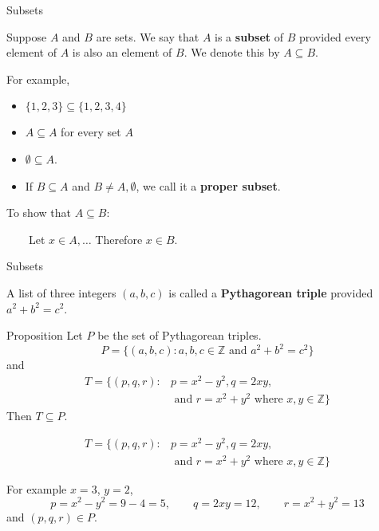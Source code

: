 \documentclass{beamer}
\def\bl[#1]#2{\begin{block}{#1}#2\end{block}}
\begin{document}
\begin{frame}{Subsets}
\begin{definition}
Suppose $A$ and $B$ are sets. We say that $A$ is a \textbf{subset} of $B$ provided every element of $A$ is also an element of $B$. We denote this by $A\subseteq B$.
\end{definition}\pause
For example,
\begin{itemize}
\item $\{1,2,3\}\subseteq \{1,2,3,4\}$\pause
\item $A\subseteq A$ for every set $A$\pause
\item $\emptyset\subseteq A$.
\item If $B\subseteq A$ and $B\neq A,\emptyset$, we call it a \textbf{proper subset}.
\end{itemize}\pause

\begin{block}{}
To show that $A\subseteq B$:

~~~~Let $x\in A,\dots$ Therefore $x\in B$.
\end{block}
\end{frame}

\begin{frame}{Subsets}
\begin{definition}
A list of three integers $(a,b,c)$ is called a \textbf{Pythagorean triple} provided $a^2+b^2=c^2$.
\end{definition}\pause

\bl[Proposition]{
Let $P$ be the set of Pythagorean triples.
\[
P=\{(a,b,c): a,b,c\in\mathbb{Z}\textrm{ and } a^2+b^2=c^2\}
\]
and
\begin{align*}
T=\{(p,q,r): &p=x^2-y^2, q=2xy,\\
&\textrm{ and } r=x^2+y^2\textrm{ where } x,y\in\mathbb{Z}\}
\end{align*}
Then $T\subseteq P$.
}
\end{frame}

\begin{frame}
\bl[]{
\vspace{-0.3cm}
\begin{align*}
T=\{(p,q,r): &p=x^2-y^2, q=2xy,\\
&\textrm{ and } r=x^2+y^2\textrm{ where } x,y\in\mathbb{Z}\}
\end{align*}}

For example $x=3$, $y=2$,
\[
p=x^2-y^2=9-4=5,\qquad q=2xy=12,\qquad r=x^2+y^2=13
\]
and $(p,q,r)\in P$.
\end{frame}
\end{document}
